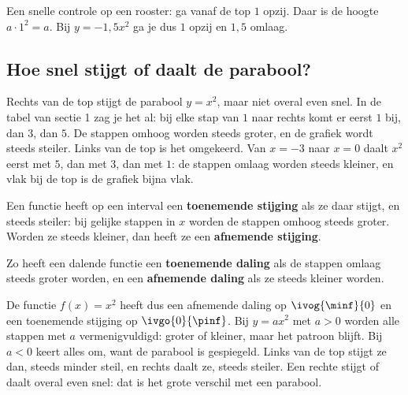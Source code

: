 Een snelle controle op een rooster: ga vanaf de top $1$ opzij. Daar is de hoogte $a \cdot 1^2 = a$. Bij $y = -1,5x^2$ ga je dus $1$ opzij en $1,5$ omlaag.

\begin{oefeningen}
\end{oefeningen}

\subsection{Hoe snel stijgt of daalt de parabool?}

Rechts van de top stijgt de parabool $y = x^2$, maar niet overal even snel. In de tabel van sectie 1 zag je het al: bij elke stap van $1$ naar rechts komt er eerst $1$ bij, dan $3$, dan $5$. De stappen omhoog worden steeds groter, en de grafiek wordt steeds steiler. Links van de top is het omgekeerd. Van $x = -3$ naar $x = 0$ daalt $x^2$ eerst met $5$, dan met $3$, dan met $1$: de stappen omlaag worden steeds kleiner, en vlak bij de top is de grafiek bijna vlak.


\begin{theorie}
Een functie heeft op een interval een \textbf{\textcolor{accent}{toenemende stijging}} als ze daar stijgt, en steeds steiler: bij gelijke stappen in $x$ worden de stappen omhoog steeds groter. Worden ze steeds kleiner, dan heeft ze een \textbf{\textcolor{accent}{afnemende stijging}}.

\vspace{1mm}
Zo heeft een dalende functie een \textbf{\textcolor{accent}{toenemende daling}} als de stappen omlaag steeds groter worden, en een \textbf{\textcolor{accent}{afnemende daling}} als ze steeds kleiner worden.
\end{theorie}

De functie $f(x) = x^2$ heeft dus een afnemende daling op $\ivog{\minf}{0}$ en een toenemende stijging op $\ivgo{0}{\pinf}$. Bij $y = ax^2$ met $a > 0$ worden alle stappen met $a$ vermenigvuldigd: groter of kleiner, maar het patroon blijft. Bij $a < 0$ keert alles om, want de parabool is gespiegeld. Links van de top stijgt ze dan, steeds minder steil, en rechts daalt ze, steeds steiler. Een rechte stijgt of daalt overal even snel: dat is het grote verschil met een parabool.

